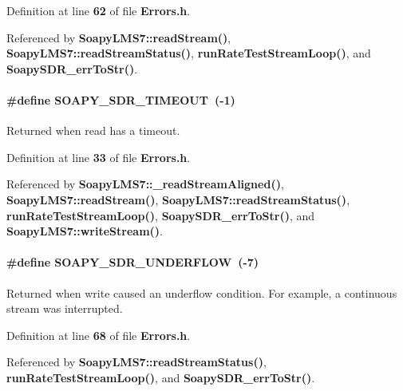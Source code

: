Definition at line {\bf 62} of file {\bf Errors.\+h}.



Referenced by {\bf Soapy\+L\+M\+S7\+::read\+Stream()}, {\bf Soapy\+L\+M\+S7\+::read\+Stream\+Status()}, {\bf run\+Rate\+Test\+Stream\+Loop()}, and {\bf Soapy\+S\+D\+R\+\_\+err\+To\+Str()}.

\paragraph[{S\+O\+A\+P\+Y\+\_\+\+S\+D\+R\+\_\+\+T\+I\+M\+E\+O\+UT}]{\setlength{\rightskip}{0pt plus 5cm}\#define S\+O\+A\+P\+Y\+\_\+\+S\+D\+R\+\_\+\+T\+I\+M\+E\+O\+UT~(-\/1)}\label{Errors_8h_af1bdb0e88cd7e4e118d22ad72501b668}
Returned when read has a timeout. 

Definition at line {\bf 33} of file {\bf Errors.\+h}.



Referenced by {\bf Soapy\+L\+M\+S7\+::\+\_\+read\+Stream\+Aligned()}, {\bf Soapy\+L\+M\+S7\+::read\+Stream()}, {\bf Soapy\+L\+M\+S7\+::read\+Stream\+Status()}, {\bf run\+Rate\+Test\+Stream\+Loop()}, {\bf Soapy\+S\+D\+R\+\_\+err\+To\+Str()}, and {\bf Soapy\+L\+M\+S7\+::write\+Stream()}.

\paragraph[{S\+O\+A\+P\+Y\+\_\+\+S\+D\+R\+\_\+\+U\+N\+D\+E\+R\+F\+L\+OW}]{\setlength{\rightskip}{0pt plus 5cm}\#define S\+O\+A\+P\+Y\+\_\+\+S\+D\+R\+\_\+\+U\+N\+D\+E\+R\+F\+L\+OW~(-\/7)}\label{Errors_8h_aefa2b38c69f1bd1bc39001dafe3b8d17}
Returned when write caused an underflow condition. For example, a continuous stream was interrupted. 

Definition at line {\bf 68} of file {\bf Errors.\+h}.



Referenced by {\bf Soapy\+L\+M\+S7\+::read\+Stream\+Status()}, {\bf run\+Rate\+Test\+Stream\+Loop()}, and {\bf Soapy\+S\+D\+R\+\_\+err\+To\+Str()}.



